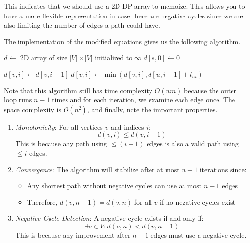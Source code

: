   This indicates that we should use a 2D DP array to memoize. This allows you to have a more flexible representation in case there are negative cycles since we are also limiting the number of edges a path could have. 

  \begin{algo}
    The implementation of the modified equations gives us the following algorithm. 
    \begin{algorithm}[H]
      \label{alg:bellman_ford_leq}
      \begin{algorithmic}[1]
        \State $d \gets$ 2D array of size $|V| \times |V|$ initialized to $\infty$
        \State $d[s,0] \gets 0$ 
        
            \State $d[v,i] \gets d[v,i-1]$ 
              \State $d[v,i] \gets \min(d[v,i], d[u,i-1] + l_{uv})$
            \EndFor
          \EndFor
        \EndFor
      \end{algorithmic}
    \end{algorithm}
    Note that this algorithm still has time complexity $O(nm)$ because the outer loop runs $n-1$ times and for each iteration, we examine each edge once. The space complexity is $O(n^2)$, and finally, note the important properties. 
    \begin{enumerate}
      \item \textit{Monotonicity}: For all vertices $v$ and indices $i$:
      \begin{equation}
        d(v,i) \leq d(v,i-1)
      \end{equation}
      This is because any path using $\leq (i-1)$ edges is also a valid path using $\leq i$ edges.

      \item \textit{Convergence}: The algorithm will stabilize after at most $n-1$ iterations since:
      \begin{itemize}
        \item Any shortest path without negative cycles can use at most $n-1$ edges
        \item Therefore, $d(v,n-1) = d(v,n)$ for all $v$ if no negative cycles exist
      \end{itemize}

      \item \textit{Negative Cycle Detection}: A negative cycle exists if and only if:
      \begin{equation}
        \exists v \in V : d(v,n) < d(v,n-1)
      \end{equation}
      This is because any improvement after $n-1$ edges must use a negative cycle.
    \end{enumerate}
  \end{algo}

